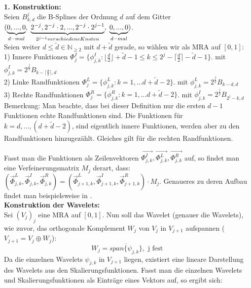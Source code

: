 \documentclass[11pt,a4paper,titlepage]{article}
\theoremstyle{plain} %
\theoremstyle{definition} %
\numberwithin{equation}{section} %
\begin{document}
	\textbf{1. Konstruktion:}\\
	Seien $B^j_{k,d}$ die B-Splines der Ordnung $d$ auf dem Gitter $(\underbrace{0,...,0}_{d-mal}, \hspace*{0.1cm} \underbrace{2^{-j},2^{-j}\cdot 2,...,2^{-j}\cdot 2^{j-1}}_{2^{j-1} verschiedene Knoten}, \hspace*{0.1cm} \underbrace{0,...,0}_{d-mal})$. \\
	Seien weiter $d\leq \tilde{d} \in \mathbb{N}_{\ge 2}$ mit $d+\tilde{d}$ gerade, so wählen wir als MRA auf $[0,1]$:\\
		1) Innere Funktionen $\Phi^I_j=\{\phi^I_{j,k}: \lfloor\frac{d}{2}\rfloor +\tilde{d} -1 \leq k \leq 2^j -\lceil \frac{d}{2} \rceil - \tilde{d}-1 \}$.
			mit  $\phi^I_{j,k}=2^\frac{j}{2}B_{k-\lceil \frac{d}{2}\rceil,d}$ \\				
		2) Linke Randfunktionen $\Phi^L_j=\{\phi^L_{j,k}: k=1,...d+\tilde{d}-2\}$. 	mit  $\phi^L_{j,k}=2^\frac{j}{2}B_{k-d,d}$ \\
		3) Rechte Randfunktionen $\Phi^R_j=\{\phi^R_{j,k}: k=1,...d+\tilde{d}-2\}$. mit  $\phi^I_{j,k}=2^\frac{j}{2}B_{2^j-k,d}$ \\
	
	Bemerkung: Man beachte, dass bei dieser Definition nur die ersten $d-1$ Funktionen echte Randfunktionen sind. Die Funktionen für $k=d,...,(d+\tilde{d}-2)$, sind eigentlich innere Funktionen, werden aber zu den Randfunktionen hinzugezählt. Gleiches gilt für die rechten Randfunktionen.
	
	Fasst man die Funktionen als Zeilenvektoren $\vec{\Phi^I_{j,k}}, \vec{\Phi^L_{j,k}}, \vec{\Phi^R_{j,k}}$ auf, so findet man eine Verfeinerungsmatrix $M_j$ derart, dass:\\
	$(\vec{\Phi}^L_{j,k}, \vec{\Phi}^I_{j,k}, \vec{\Phi}^R_{j,k})=(\vec{\Phi}^L_{j+1,k}, \vec{\Phi}^I_{j+1,k}, \vec{\Phi}^R_{j+1,k}) \cdot M_j$.
	Genaueres zu deren Aufbau findet man beispielsweise in \cite{Primbs2006}.
	\\
	\textbf{Konstruktion der Wavelets:}\\
	Sei $(V_j)_j$ eine MRA auf $[0,1]$. Nun soll das Wavelet (genauer die Wavelets), wie zuvor, das orthogonale Komplement $W_j$ von $V_j$ in $V_{j+1}$ aufspannen ($V_{j+1}=V_j \oplus W_j$): 
	\begin{equation}
		W_j=\overline{span\{\psi_{j,k}\}}, \text{ j fest }
	\end{equation}
	Da die einzelnen Wavelets $\psi_{j,k}$ in $V_{j+1}$ liegen, existiert eine lineare Darstellung des Wavelets aus den Skalierungsfunktionen. Fasst man die einzelnen Wavelets und Skalierungsfunktionen als Einträge eines Vektors auf, so ergibt sich:
	
\end{document}
